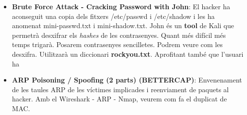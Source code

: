 \documentclass[]{article}
\begin{document}
\begin{itemize}
\item
  \textbf{Brute Force Attack - Cracking Password with John}: El hacker
  ha aconseguit una copia dels fitxers /etc/passwd i /etc/shadow i les
  ha anomenat mini-passwd.txt i mini-shadow.txt. John és un
  \textbf{tool} de Kali que permetrà desxifrar els \emph{hashes} de les
  contrasenyes. Quant més difícil més temps trigarà. Posarem
  contrasenyes sencilletes. Podrem veure com les desxifra. Utilitzarà un
  diccionari \textbf{rockyou.txt}. Aprofitant també que l'usuari ha
\item
  \textbf{ARP Poisoning / Spoofing (2 parts) (BETTERCAP)}: Envenenament
  de les taules ARP de les víctimes implicades i reenviament de paquets
  al hacker. Amb el Wireshark - ARP - Nmap, veurem com fa el duplicat de
  MAC.


\end{itemize}
\end{document}
